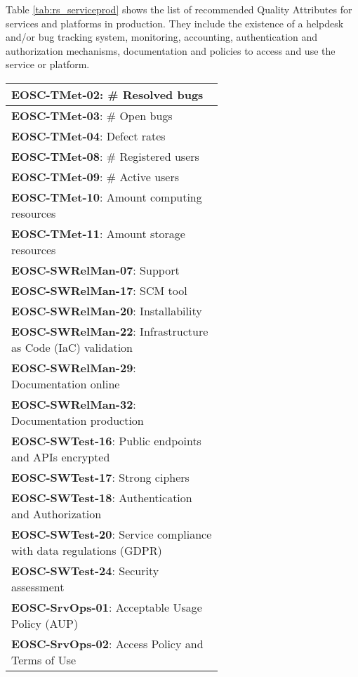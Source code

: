 Table \ref{tab:rs_serviceprod} shows the list of recommended Quality Attributes for services and platforms in production. They include the existence of a helpdesk and/or bug tracking system, monitoring, accounting, authentication and authorization mechanisms, documentation and policies to access and use the service or platform.

\begin{table}[h]
    \centering
    \scriptsize
    \begin{tabular}{|p{0.6\linewidth}|} \hline

        \textbf{EOSC-TMet-02}: \# Resolved bugs \\ \hline
        \textbf{EOSC-TMet-03}: \# Open bugs \\ \hline
        \textbf{EOSC-TMet-04}: Defect rates \\ \hline
        \textbf{EOSC-TMet-08}: \# Registered users \\ \hline
        \textbf{EOSC-TMet-09}: \# Active users \\ \hline
        \textbf{EOSC-TMet-10}: Amount computing resources \\ \hline
        \textbf{EOSC-TMet-11}: Amount storage resources \\ \hline
        \textbf{EOSC-SWRelMan-07}: Support \\ \hline
        \textbf{EOSC-SWRelMan-17}: SCM tool \\ \hline
        \textbf{EOSC-SWRelMan-20}: Installability \\ \hline
        \textbf{EOSC-SWRelMan-22}: Infrastructure as Code (IaC) validation \\ \hline
        \textbf{EOSC-SWRelMan-29}: Documentation online \\ \hline
        \textbf{EOSC-SWRelMan-32}: Documentation production \\ \hline
        \textbf{EOSC-SWTest-16}: Public endpoints and APIs encrypted \\ \hline
        \textbf{EOSC-SWTest-17}: Strong ciphers \\ \hline
        \textbf{EOSC-SWTest-18}: Authentication and Authorization \\ \hline
        \textbf{EOSC-SWTest-20}: Service compliance with data regulations (GDPR) \\ \hline
        \textbf{EOSC-SWTest-24}: Security assessment \\ \hline
        \textbf{EOSC-SrvOps-01}: Acceptable Usage Policy (AUP) \\ \hline
        \textbf{EOSC-SrvOps-02}: Access Policy and Terms of Use \\ \hline

\end{tabular}
\end{table}
